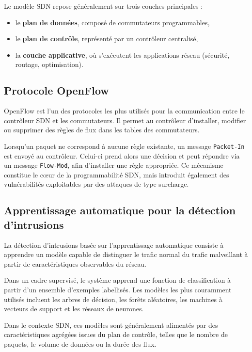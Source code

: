 \documentclass[11pt]{article}
\begin{document}
Le modèle SDN repose généralement sur trois couches principales :

\begin{itemize}
    \item le \textbf{plan de données}, composé de commutateurs programmables,
    \item le \textbf{plan de contrôle}, représenté par un contrôleur centralisé,
    \item la \textbf{couche applicative}, où s’exécutent les applications réseau (sécurité, routage, optimisation).
\end{itemize}

\subsection{Protocole OpenFlow}

OpenFlow est l’un des protocoles les plus utilisés pour la communication entre le contrôleur SDN et les commutateurs. Il permet au contrôleur d’installer, modifier ou supprimer des règles de flux dans les tables des commutateurs.

Lorsqu’un paquet ne correspond à aucune règle existante, un message \texttt{Packet-In} est envoyé au contrôleur. Celui-ci prend alors une décision et peut répondre via un message \texttt{Flow-Mod}, afin d’installer une règle appropriée. Ce mécanisme constitue le cœur de la programmabilité SDN, mais introduit également des vulnérabilités exploitables par des attaques de type surcharge.

\subsection{Apprentissage automatique pour la détection d’intrusions}

La détection d’intrusions basée sur l’apprentissage automatique consiste à apprendre un modèle capable de distinguer le trafic normal du trafic malveillant à partir de caractéristiques observables du réseau.

Dans un cadre supervisé, le système apprend une fonction de classification à partir d’un ensemble d’exemples labellisés. Les modèles les plus couramment utilisés incluent les arbres de décision, les forêts aléatoires, les machines à vecteurs de support et les réseaux de neurones.

Dans le contexte SDN, ces modèles sont généralement alimentés par des caractéristiques agrégées issues du plan de contrôle, telles que le nombre de paquets, le volume de données ou la durée des flux.
\end{document}
